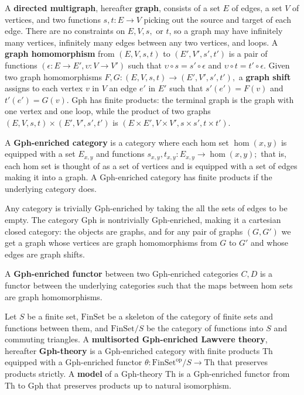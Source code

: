 \documentclass{llncs}
\newcommand{\maps}{\colon}
\newcommand{\Th}{\mathrm{Th}}
\newcommand{\FinSet}{\mathrm{FinSet}}
\newcommand{\op}{\mathrm{op}}
\begin{document}
A {\bf directed multigraph}, hereafter {\bf graph}, consists of a set $E$ of edges, a set $V$ of vertices, and two functions $s,t\maps E \to V$ picking out the source and target of each edge.  There are no constraints on $E, V, s,$ or $t$, so a graph may have infinitely many vertices, infinitely many edges between any two vertices, and loops.  A {\bf graph homomorphism} from $(E, V, s, t)$ to $(E', V', s', t')$ is a pair of functions $(\epsilon\maps E \to E', \upsilon\maps V \to V')$ such that $\upsilon\circ s = s' \circ \epsilon$ and $\upsilon\circ t = t' \circ \epsilon$.  Given two graph homomorphisms $F, G\maps (E, V, s, t) \to (E', V', s', t'),$ a {\bf graph shift} assigns to each vertex $v$ in $V$ an edge $e'$ in $E'$ such that $s'(e') = F(v)$ and $t'(e') = G(v).$  Gph has finite products: the terminal graph is the graph with one vertex and one loop, while the product of two graphs $(E, V, s, t) \times (E', V', s', t')$ is $(E \times E', V \times V', s \times s', t\times t').$

A {\bf Gph-enriched category} is a category where each hom set $\hom(x,y)$ is equipped with a set $E_{x,y}$ and functions $s_{x,y}, t_{x,y}\maps E_{x,y} \to \hom(x,y);$ that is, each hom set is thought of as a set of vertices and is equipped with a set of edges making it into a graph.  A Gph-enriched category has finite products if the underlying category does.

Any category is trivially Gph-enriched by taking the all the sets of edges to be empty.  The category Gph is nontrivially Gph-enriched, making it a cartesian closed category: the objects are graphs, and for any pair of graphs $(G, G')$ we get a graph whose vertices are graph homomorphisms from $G$ to $G'$ and whose edges are graph shifts.

A {\bf Gph-enriched functor} between two Gph-enriched categories $C, D$ is a functor between the underlying categories such that the maps between hom sets are graph homomorphisms.

Let $S$ be a finite set, $\FinSet$ be a skeleton of the category of finite sets and functions between them, and $\FinSet/S$ be the category of functions into $S$ and commuting triangles.  A {\bf multisorted Gph-enriched Lawvere theory}, hereafter {\bf Gph-theory} is a Gph-enriched category with finite products Th equipped with a Gph-enriched functor $\theta\maps \FinSet^{\op}/S \to \Th$ that preserves products strictly.  A {\bf model} of a Gph-theory Th is a Gph-enriched functor from Th to Gph that preserves products up to natural isomorphism.
\end{document}
